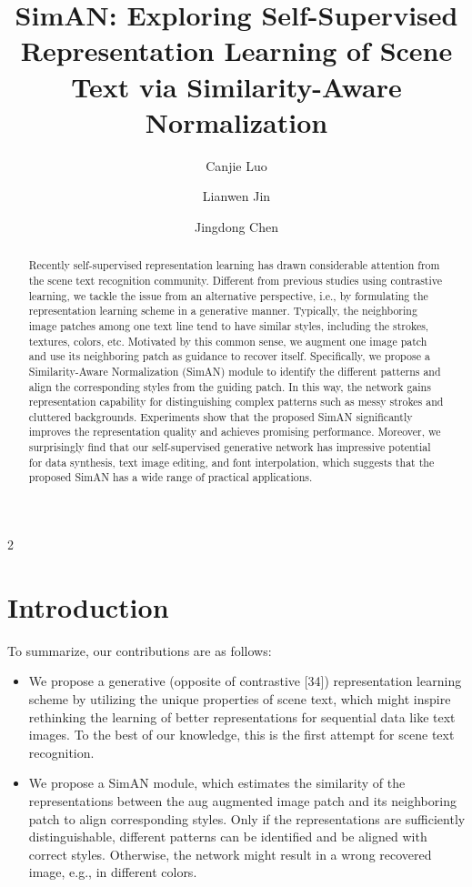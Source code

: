 \documentclass{article}
\title{ SimAN: Exploring Self-Supervised Representation Learning of Scene Text
via Similarity-Aware Normalization}
\author[1]{\raggedright Canjie Luo}
\author[1,2,$\asteric$]{\raggedright Lianwen Jin}
\author[3]{\raggedright Jingdong Chen}
\affil[1]{South China University of Technology, }
\affil[2]{Peng Cheng Laboratory,}
\affil[3]{Ant Group}
\begin{document}
\maketitle

\begin{multicols}{2}
\begin{abstract}
    Recently self-supervised representation learning has
drawn considerable attention from the scene text recognition
community. Different from previous studies using contrastive
learning, we tackle the issue from an alternative
perspective, i.e., by formulating the representation learning
scheme in a generative manner. Typically, the neighboring
image patches among one text line tend to have similar
styles, including the strokes, textures, colors, etc. Motivated
by this common sense, we augment one image patch
and use its neighboring patch as guidance to recover itself.
Specifically, we propose a Similarity-Aware Normalization
(SimAN) module to identify the different patterns and align
the corresponding styles from the guiding patch. In this
way, the network gains representation capability for distinguishing
complex patterns such as messy strokes and cluttered
backgrounds. Experiments show that the proposed
SimAN significantly improves the representation quality and
achieves promising performance. Moreover, we surprisingly
find that our self-supervised generative network has
impressive potential for data synthesis, text image editing,
and font interpolation, which suggests that the proposed
SimAN has a wide range of practical applications.

\end{abstract}

\section{Introduction}
To summarize, our contributions are as follows:
\begin{itemize}
    \item We propose a generative (opposite of contrastive [34])
representation learning scheme by utilizing the unique
properties of scene text, which might inspire rethinking
the learning of better representations for sequential
data like text images. To the best of our knowledge,
this is the first attempt for scene text recognition.

    \item We propose a SimAN module, which estimates the
similarity of the representations between the aug augmented
image patch and its neighboring patch to align
corresponding styles. Only if the representations are
sufficiently distinguishable, different patterns can be
identified and be aligned with correct styles. Otherwise,
the network might result in a wrong recovered
image, e.g., in different colors.


\end{itemize}
\end{multicols}
\end{document}
